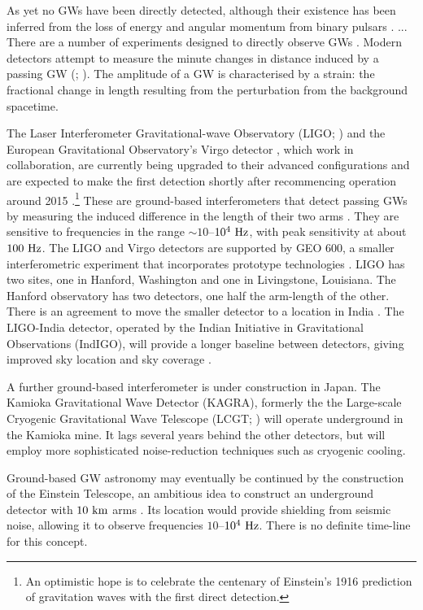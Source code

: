As yet no GWs have been directly detected, although their existence has been inferred from the loss of energy and angular momentum from binary pulsars \citep{Stairs2003}. ... There are a number of experiments designed to directly observe GWs \citep{Riles2012}. Modern detectors attempt to measure the minute changes in distance induced by a passing GW (\citealt[section 9.5]{Thorne1987}; \citealt[section 18.9]{Hobson2006}). The amplitude of a GW is characterised by a strain: the fractional change in length resulting from the perturbation from the background spacetime.

The Laser Interferometer Gravitational-wave Observatory (LIGO; \citealt{Abramovici1992}) and the European Gravitational Observatory's Virgo detector \citep{Acernese2008a}, which work in collaboration, are currently being upgraded to their advanced configurations and are expected to make the first detection shortly after recommencing operation around 2015 \citep{Harry2010,Accadia2011}.\footnote{An optimistic hope is to celebrate the centenary of Einstein's 1916 prediction of gravitation waves \citep[document 32]{Einstein1997} with the first direct detection.} These are ground-based interferometers that detect passing GWs by measuring the induced difference in the length of their two arms \citep{Pitkin2011}. They are sensitive to frequencies in the range $\sim10$--$10^4~\mathrm{Hz}$, with peak sensitivity at about $100~\mathrm{Hz}$. The LIGO and Virgo detectors are supported by GEO 600, a smaller interferometric experiment that incorporates prototype technologies \citep{Willke2002,Willke2006}. LIGO has two sites, one in Hanford, Washington and one in Livingstone, Louisiana. The Hanford observatory has two detectors, one half the arm-length of the other. There is an agreement to move the smaller detector to a location in India \citep{Unnikrishnan2013}. The LIGO-India detector, operated by the Indian Initiative in Gravitational Observations (IndIGO), will provide a longer baseline between detectors, giving improved sky location and sky coverage \citep{Schutz2011}.

A further ground-based interferometer is under construction in Japan. The Kamioka Gravitational Wave Detector (KAGRA), formerly the the Large-scale Cryogenic Gravitational Wave Telescope (LCGT; \citealt{Kuroda1999,Kuroda2010}) will operate underground in the Kamioka mine. It lags several years behind the other detectors, but will employ more sophisticated noise-reduction techniques such as cryogenic cooling.

Ground-based GW astronomy may eventually be continued by the construction of the Einstein Telescope, an ambitious idea to construct an underground detector with $10~\mathrm{km}$ arms \citep{Punturo2010,Hild2011,Sathyaprakash2012}. Its location would provide shielding from seismic noise, allowing it to observe frequencies $10$--$10^4~\mathrm{Hz}$. There is no definite time-line for this concept.

